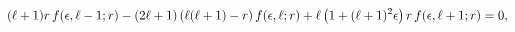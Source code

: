 \[(\ell+1)r\mathop{f\/}\nolimits\!\left(\epsilon,\ell-1;r\right)-(2\ell+1)\left(%
\ell(\ell+1)-r\right)\mathop{f\/}\nolimits\!\left(\epsilon,\ell;r\right)+\ell%
\left(1+(\ell+1)^{2}\epsilon\right)r\mathop{f\/}\nolimits\!\left(\epsilon,\ell%
+1;r\right)=0,\]